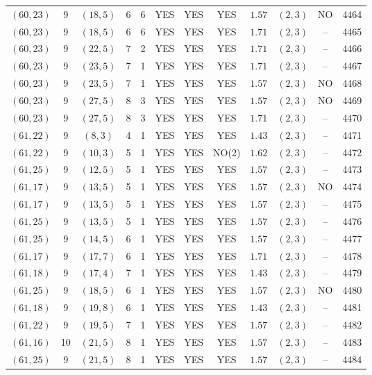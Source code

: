 \begin{longtable}{|c|c|c|c|c|c|c|c|c|c|c|c|}
$(60,23)$ & 9 & $(18,5)$ & 6 & 6 & YES & YES & YES & $1.57$ & $(2,3)$ & NO & 4464\\
$(60,23)$ & 9 & $(18,5)$ & 6 & 6 & YES & YES & YES & $1.71$ & $(2,3)$ & -- & 4465\\
$(60,23)$ & 9 & $(22,5)$ & 7 & 2 & YES & YES & YES & $1.71$ & $(2,3)$ & -- & 4466\\
$(60,23)$ & 9 & $(23,5)$ & 7 & 1 & YES & YES & YES & $1.71$ & $(2,3)$ & -- & 4467\\
$(60,23)$ & 9 & $(23,5)$ & 7 & 1 & YES & YES & YES & $1.57$ & $(2,3)$ & NO & 4468\\
$(60,23)$ & 9 & $(27,5)$ & 8 & 3 & YES & YES & YES & $1.57$ & $(2,3)$ & NO & 4469\\
$(60,23)$ & 9 & $(27,5)$ & 8 & 3 & YES & YES & YES & $1.71$ & $(2,3)$ & -- & 4470\\
$(61,22)$ & 9 & $(8,3)$ & 4 & 1 & YES & YES & YES & $1.43$ & $(2,3)$ & -- & 4471\\
$(61,22)$ & 9 & $(10,3)$ & 5 & 1 & YES & YES & NO(2) & $1.62$ & $(2,3)$ & -- & 4472\\
$(61,25)$ & 9 & $(12,5)$ & 5 & 1 & YES & YES & YES & $1.57$ & $(2,3)$ & -- & 4473\\
$(61,17)$ & 9 & $(13,5)$ & 5 & 1 & YES & YES & YES & $1.57$ & $(2,3)$ & NO & 4474\\
$(61,17)$ & 9 & $(13,5)$ & 5 & 1 & YES & YES & YES & $1.57$ & $(2,3)$ & -- & 4475\\
$(61,25)$ & 9 & $(13,5)$ & 5 & 1 & YES & YES & YES & $1.57$ & $(2,3)$ & -- & 4476\\
$(61,25)$ & 9 & $(14,5)$ & 6 & 1 & YES & YES & YES & $1.57$ & $(2,3)$ & -- & 4477\\
$(61,17)$ & 9 & $(17,7)$ & 6 & 1 & YES & YES & YES & $1.71$ & $(2,3)$ & -- & 4478\\
$(61,18)$ & 9 & $(17,4)$ & 7 & 1 & YES & YES & YES & $1.43$ & $(2,3)$ & -- & 4479\\
$(61,25)$ & 9 & $(18,5)$ & 6 & 1 & YES & YES & YES & $1.57$ & $(2,3)$ & NO & 4480\\
$(61,18)$ & 9 & $(19,8)$ & 6 & 1 & YES & YES & YES & $1.43$ & $(2,3)$ & -- & 4481\\
$(61,22)$ & 9 & $(19,5)$ & 7 & 1 & YES & YES & YES & $1.57$ & $(2,3)$ & -- & 4482\\
$(61,16)$ & 10 & $(21,5)$ & 8 & 1 & YES & YES & YES & $1.57$ & $(2,3)$ & -- & 4483\\
$(61,25)$ & 9 & $(21,5)$ & 8 & 1 & YES & YES & YES & $1.57$ & $(2,3)$ & -- & 4484\\

\end{longtable}
